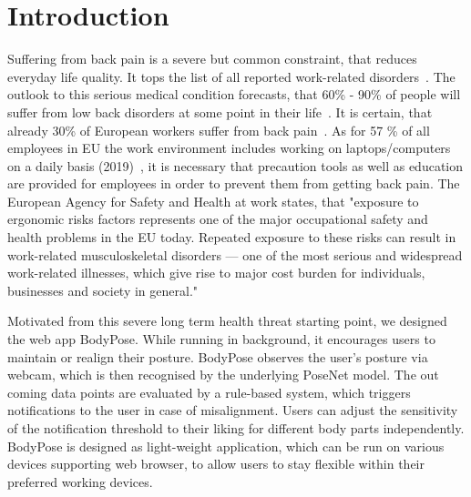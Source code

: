 \section{Introduction} %
\label{introduction}

Suffering from back pain is a severe but common constraint, that reduces everyday life quality. It tops the list of all reported work-related disorders~\cite{osha2000facts}. The outlook to this serious medical condition forecasts, that 60\% - 90\% of people will suffer from low back disorders at some point in their life~\cite{osha2000facts}. It is certain, that already 30\% of European workers suffer from back pain~\cite{osha2000facts}. As for 57 \% of all employees in EU the work environment includes working on laptops/computers on a daily basis (2019)~\cite{eurostat_comp_use}, it is necessary that precaution tools as well as education are provided for employees in order to prevent them from getting back pain. The European Agency for Safety and Health at work states, that "exposure to ergonomic risks factors represents one of the major occupational safety and health problems in the EU today. Repeated exposure to these risks can result in work-related musculoskeletal disorders — one of the most serious and widespread work-related illnesses, which give rise to major cost burden for individuals, businesses and society in general."~\cite{osha2019msd}

Motivated from this severe long term health threat starting point, we designed the web app BodyPose. While running in background, it encourages users to maintain or realign their posture. BodyPose observes the user's posture via webcam, which is then recognised by the underlying PoseNet model. The out coming data points are evaluated by a rule-based system, which triggers notifications to the user in case of misalignment. Users can adjust the sensitivity of the notification threshold to their liking for different body parts independently. BodyPose is designed as light-weight application, which can be run on various devices supporting web browser, to allow users to stay flexible within their preferred working devices.

